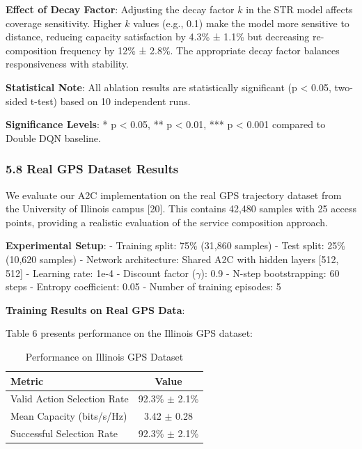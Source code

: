 {\textbf{Effect of Decay Factor}: Adjusting the decay factor \(k\) in the
STR model affects coverage sensitivity. Higher \(k\) values (e.g., 0.1)
make the model more sensitive to distance, reducing capacity
satisfaction by 4.3\% ± 1.1\% but decreasing re-composition frequency by
12\% ± 2.8\%. The appropriate decay factor balances responsiveness with
stability.

\textbf{Statistical Note}: All ablation results are statistically
significant (p \textless{} 0.05, two-sided t-test) based on 10
independent runs.

\textbf{Significance Levels}: * p \textless{} 0.05, ** p \textless{}
0.01, *** p \textless{} 0.001 compared to Double DQN baseline.

\hypertarget{real-gps-dataset-results}{%
	\subsubsection{5.8 Real GPS Dataset
		Results}\label{real-gps-dataset-results}}

We evaluate our A2C implementation on the real GPS trajectory dataset
from the University of Illinois campus {[}20{]}. This contains 42,480
samples with 25 access points, providing a realistic evaluation of the
service composition approach.

\textbf{Experimental Setup}: - Training split: 75\% (31,860 samples) -
Test split: 25\% (10,620 samples) - Network architecture: Shared A2C
with hidden layers {[}512, 512{]} - Learning rate: 1e-4 - Discount
factor ($\gamma$): 0.9 - N-step bootstrapping: 60 steps - Entropy coefficient:
0.05 - Number of training episodes: 5

\textbf{Training Results on Real GPS Data}:

Table 6 presents performance on the Illinois GPS dataset:

\begin{table}[htbp]
	\centering
	\caption{Performance on Illinois GPS Dataset}
	\label{illinois-gps-table}
	\begin{tabular}{|l|c|}
		\toprule
		\textbf{Metric}             & \textbf{Value}     \\
		\midrule
		Valid Action Selection Rate & 92.3\% $\pm$ 2.1\% \\
		Mean Capacity (bits/s/Hz)   & 3.42 $\pm$ 0.28    \\
		Successful Selection Rate   & 92.3\% $\pm$ 2.1\% \\
		\bottomrule
	\end{tabular}
\end{table}

}

